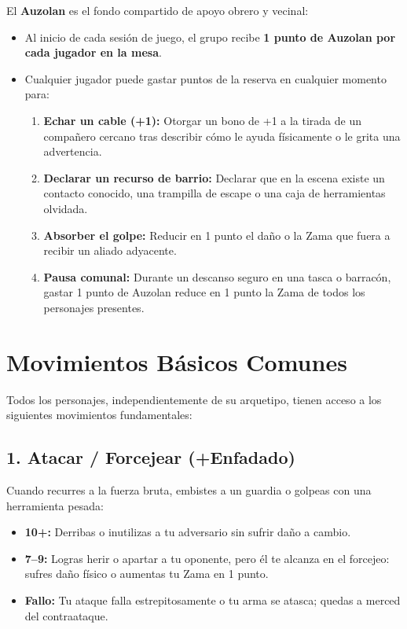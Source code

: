 El \textbf{Auzolan} es el fondo compartido de apoyo obrero y vecinal:
\begin{itemize}
  \item Al inicio de cada sesión de juego, el grupo recibe \textbf{1 punto de Auzolan por cada jugador en la mesa}.
  \item Cualquier jugador puede gastar puntos de la reserva en cualquier momento para:
    \begin{enumerate}
      \item \textbf{Echar un cable (+1):} Otorgar un bono de +1 a la tirada de un compañero cercano tras describir cómo le ayuda físicamente o le grita una advertencia.
      \item \textbf{Declarar un recurso de barrio:} Declarar que en la escena existe un contacto conocido, una trampilla de escape o una caja de herramientas olvidada.
      \item \textbf{Absorber el golpe:} Reducir en 1 punto el daño o la Zama que fuera a recibir un aliado adyacente.
      \item \textbf{Pausa comunal:} Durante un descanso seguro en una tasca o barracón, gastar 1 punto de Auzolan reduce en 1 punto la Zama de todos los personajes presentes.
    \end{enumerate}
\end{itemize}

\section{Movimientos Básicos Comunes}

Todos los personajes, independientemente de su arquetipo, tienen acceso a los siguientes movimientos fundamentales:

\subsection{1. Atacar / Forcejear (+Enfadado)}
Cuando recurres a la fuerza bruta, embistes a un guardia o golpeas con una herramienta pesada:
\begin{itemize}
  \item \textbf{10+:} Derribas o inutilizas a tu adversario sin sufrir daño a cambio.
  \item \textbf{7--9:} Logras herir o apartar a tu oponente, pero él te alcanza en el forcejeo: sufres daño físico o aumentas tu Zama en 1 punto.
  \item \textbf{Fallo:} Tu ataque falla estrepitosamente o tu arma se atasca; quedas a merced del contraataque.
\end{itemize}

